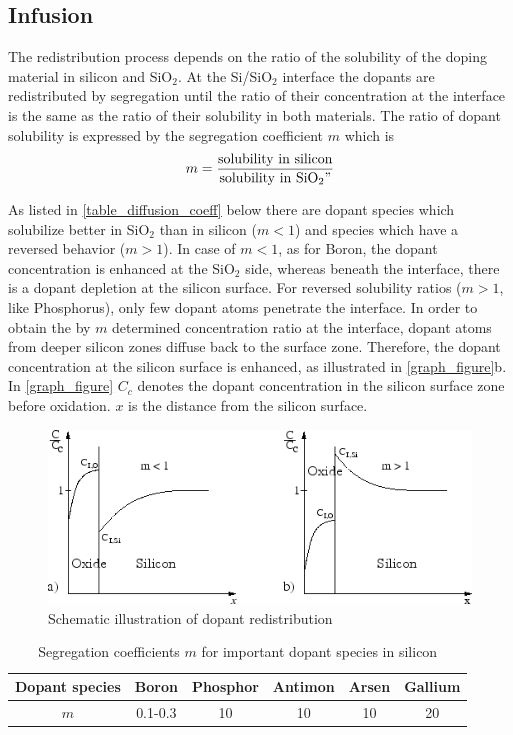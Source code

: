 \subsection{Infusion}
The redistribution process depends on the ratio of the solubility of the doping material in silicon and SiO$ _2$. At the Si/SiO$ _2$ interface the dopants are redistributed by segregation until the ratio of their concentration at the interface is the same as the ratio of their solubility in both materials. The ratio of dopant solubility is expressed by the segregation coefficient $m$ which is
\begin{equation}
\displaystyle m = \frac{
	\mathrm{solubility\ in\ silicon}
	}{
	\mathrm{solubility\ in\ SiO_2"}
	}
\end{equation}

As listed in \autoref{table_diffusion_coeff} below there are dopant species which solubilize better in SiO$ _2$ than in silicon ($ m < 1$) and species which have a reversed behavior ($ m > 1$).
In case of $ m < 1$, as for Boron, the dopant concentration is enhanced at the SiO$ _2$ side, whereas beneath the interface, there is a dopant depletion at the silicon surface.
For reversed solubility ratios ($ m > 1$, like Phosphorus), only few dopant atoms penetrate the interface.
In order to obtain the by $ m$ determined concentration ratio at the interface, dopant atoms from deeper silicon zones diffuse back to the surface zone.
Therefore, the dopant concentration at the silicon surface is enhanced, as illustrated in \autoref{graph_figure}b.
In \autoref{graph_figure} $ C_c$ denotes the dopant concentration in the silicon surface zone before oxidation. $ x$ is the distance from the silicon surface.
\begin{center}
	\begin{figure}[h]
		\begin{center}
			\includegraphics[width=0.75\linewidth]{img349.png}
		\end{center}
		\caption{Schematic illustration of dopant redistribution}
		\label{graph_figure}
	\end{figure}
	\begin{table}[h]
		\begin{tabular}{|c|c|c|c|c|c|}
			\hline
			Dopant species &
			Boron &
			Phosphor &
			Antimon &
			Arsen &
			Gallium \\
			\hline
			$m$ &
			0.1-0.3 &
			10 &
			10 &
			10 &
			20 \\
			\hline
		\end{tabular}
		\caption{Segregation coefficients $m$ for important dopant species in silicon}
		\label{table_diffusion_coeff}
	\end{table}
\end{center}